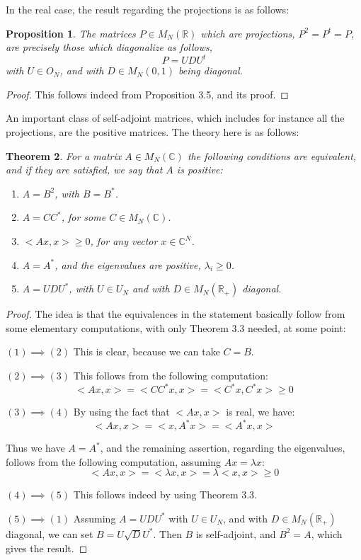 \documentclass[12pt]{amsbook}
\newtheorem{theorem}{Theorem}[chapter]
\newtheorem{proposition}[theorem]{Proposition}
\begin{document}
In the real case, the result regarding the projections is as follows:

\begin{proposition}
The matrices $P\in M_N(\mathbb R)$ which are projections, $P^2=P^t=P$, are precisely those which diagonalize as follows,
$$P=UDU^t$$
with $U\in O_N$, and with $D\in M_N(0,1)$ being diagonal.
\end{proposition}

\begin{proof}
This follows indeed from Proposition 3.5, and its proof. 
\end{proof}

An important class of self-adjoint matrices, which includes for instance all the projections, are the positive matrices. The theory here is as follows:


\begin{theorem}
For a matrix $A\in M_N(\mathbb C)$ the following conditions are equivalent, and if they are satisfied, we say that $A$ is positive:
\begin{enumerate}
\item $A=B^2$, with $B=B^*$.

\item $A=CC^*$, for some $C\in M_N(\mathbb C)$.

\item $<Ax,x>\geq0$, for any vector $x\in\mathbb C^N$.

\item $A=A^*$, and the eigenvalues are positive, $\lambda_i\geq0$.

\item $A=UDU^*$, with $U\in U_N$ and with $D\in M_N(\mathbb R_+)$ diagonal.
\end{enumerate}
\end{theorem}

\begin{proof}
The idea is that the equivalences in the statement basically follow from some elementary computations, with only Theorem 3.3 needed, at some point:

\medskip

$(1)\implies(2)$ This is clear, because we can take $C=B$.

\medskip

$(2)\implies(3)$ This follows from the following computation:
$$<Ax,x>
=<CC^*x,x>
=<C^*x,C^*x>
\geq0$$

$(3)\implies(4)$ By using the fact that $<Ax,x>$ is real, we have:
$$<Ax,x>
=<x,A^*x>
=<A^*x,x>$$

Thus we have $A=A^*$, and the remaining assertion, regarding the eigenvalues, follows from the following computation, assuming $Ax=\lambda x$:
$$<Ax,x>
=<\lambda x,x>
=\lambda<x,x>
\geq0$$

$(4)\implies(5)$ This follows indeed by using Theorem 3.3.

\medskip

$(5)\implies(1)$ Assuming $A=UDU^*$ with $U\in U_N$, and with $D\in M_N(\mathbb R_+)$ diagonal, we can set $B=U\sqrt{D}U^*$. Then $B$ is self-adjoint, and $B^2=A$, which gives the result.
\end{proof}
\end{document}
